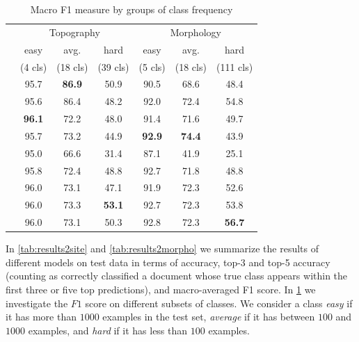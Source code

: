 \begin{table}
  \centering
  \caption{Macro F1 measure by groups of class frequency}
  \label{tab:results2difficulty}
  \begin{tabular}{cccc|ccc}
    \hline
    &\multicolumn{3}{c}{Topography}&\multicolumn{3}{c}{Morphology}\\
    &easy&avg.&hard&easy&avg.&hard\\
    &(4 cls)&(18 cls)&(39 cls)&(5 cls)&(18 cls)&(111 cls)\\
    \hline
    \svm{}     &95.7&\textbf{86.9}&50.9&90.5&68.6&48.4\\
    \xgb{}     &95.6&86.4&48.2&92.0&72.4&54.8\\
    \hline
    \gru{}     &\textbf{96.1}&72.2&48.0&91.4&71.6&49.7\\
    \bert{}    &95.7&73.2&44.9&\textbf{92.9}&\textbf{74.4}&43.9\\    
    \hline
    \maxi{}    &95.0&66.6&31.4&87.1&41.9&25.1\\
    \maxh{}    &95.8&72.4&48.8&92.7&71.8&48.8\\
    \softmaxh{}&96.0&73.1&47.1&91.9&72.3&52.6\\
    \maxp{}    &96.0&73.3&\textbf{53.1}&92.7&72.3&53.8\\
    \softmax{} &96.0&73.1&50.3&92.8&72.3&\textbf{56.7}\\
    \hline
  \end{tabular}
\end{table}


In \cref{tab:results2site} and \cref{tab:results2morpho} we summarize the results
of different models on test data in terms of accuracy, top-3 and top-5
accuracy (counting as correctly classified a document whose true class
appears within the first three or five top predictions), and
macro-averaged F1 score. In \cref{tab:results2difficulty} we
investigate the $F1$ score on different subsets of classes. We
consider a class \emph{easy} if it has more than $1000$ examples in
the test set, \emph{average} if it has between $100$ and $1000$
examples, and \emph{hard} if it has less than $100$ examples.

